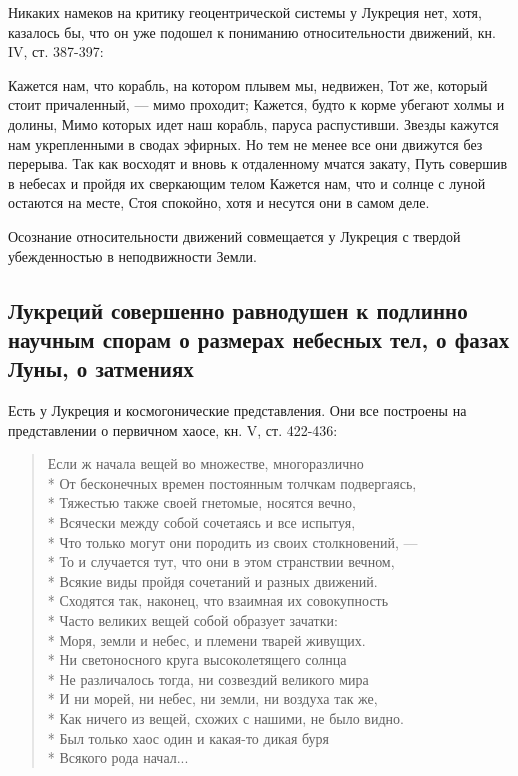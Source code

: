 Никаких намеков на критику геоцентрической системы у Лукреция нет,
хотя, казалось бы, что он уже подошел к пониманию относительности
движений, кн. IV, ст. 387-397:

Кажется нам, что корабль, на котором плывем мы, недвижен, Тот же,
который стоит причаленный, --- мимо проходит; Кажется, будто к корме
убегают холмы и долины, Мимо которых идет наш корабль, паруса
распустивши. Звезды кажутся нам укрепленными в сводах эфирных. Но тем
не менее все они движутся без перерыва. Так как восходят и вновь к
отдаленному мчатся закату, Путь совершив в небесах и пройдя их
сверкающим телом Кажется нам, что и солнце с луной остаются на месте,
Стоя спокойно, хотя и несутся они в самом деле.

Осознание относительности движений совмещается у Лукреция с твердой
убежденностью в неподвижности Земли.

\subsection{Лукреций совершенно равнодушен к подлинно научным спорам о
размерах небесных тел, о фазах Луны, о затмениях}

Есть у Лукреция и космогонические представления. Они все построены
на представлении о первичном хаосе, кн. V, ст. 422-436:

\begin{verse}
        Если ж начала вещей во множестве, многоразлично\\*
        От бесконечных времен постоянным толчкам подвергаясь,\\*
        Тяжестью также своей гнетомые, носятся вечно,\\*
        Всячески между собой сочетаясь и все испытуя,\\*
        Что только могут они породить из своих столкновений, ---\\*
        То и случается тут, что они в этом странствии вечном,\\*
        Всякие виды пройдя сочетаний и разных движений.\\*
        Сходятся так, наконец, что взаимная их совокупность\\*
        Часто великих вещей собой образует зачатки:\\*
        Моря, земли и небес, и племени тварей живущих.\\*
        Ни светоносного круга высоколетящего солнца\\*
        Не различалось тогда, ни созвездий великого мира\\*
        И ни морей, ни небес, ни земли, ни воздуха так же,\\*
        Как ничего из вещей, схожих с нашими, не было видно.\\*
        Был только хаос один и какая-то дикая буря\\*
        Всякого рода начал...
\end{verse}

